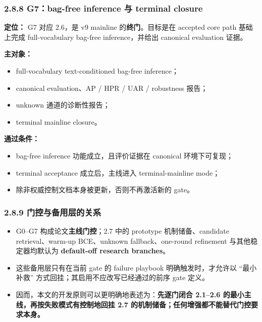 \documentclass[UTF8]{ctexart}
\begin{document}
\subsubsection*{2.8.8 G7：bag-free inference 与 terminal closure}
\textbf{定位：} G7 对应 2.6，是 v9 mainline 的\textbf{终门}。目标是在 accepted core path 基础上完成 full-vocabulary bag-free inference，并给出 canonical evaluation 证据。

\textbf{主对象：}
\begin{itemize}
\item full-vocabulary text-conditioned bag-free inference；
\item canonical evaluation、AP / HPR / UAR / robustness 报告；
\item unknown 通道的诊断性报告；
\item terminal mainline closure。
\end{itemize}

\textbf{通过条件：}
\begin{itemize}
\item bag-free inference 功能成立，且评价证据在 canonical 环境下可复现；
\item terminal acceptance 成立后，主线进入 terminal-mainline mode；
\item 除非权威控制文档本身被更新，否则不再激活新的 gate。
\end{itemize}

\subsubsection*{2.8.9 门控与备用层的关系}
\begin{itemize}
\item G0--G7 构成论文\textbf{主线门控}；2.7 中的 prototype 机制储备、candidate retrieval、warm-up BCE、unknown fallback、one-round refinement 与其他稳定器均默认为 \textbf{default-off research branches}。
\item 这些备用层只有在当前 gate 的 failure playbook 明确触发时，才允许以 ``最小补救'' 方式回挂；其启用不应改写已经通过的前序 gate 定义。
\item 因而，本文的开发原则可以更明确地表述为：\textbf{先逐门闭合 2.1--2.6 的最小主线，再按失败模式有控制地回挂 2.7 的机制储备；任何增强都不能替代门控要求本身。}
\end{itemize}
\end{document}
